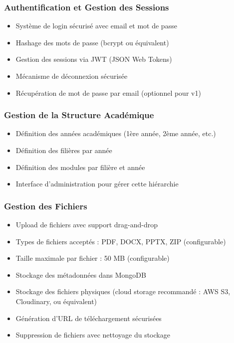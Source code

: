 \documentclass[12pt,a4paper]{article}
\begin{document}
\subsubsection{Authentification et Gestion des Sessions}

\begin{itemize}[leftmargin=*]
    \item Système de login sécurisé avec email et mot de passe
    \item Hashage des mots de passe (bcrypt ou équivalent)
    \item Gestion des sessions via JWT (JSON Web Tokens)
    \item Mécanisme de déconnexion sécurisée
    \item Récupération de mot de passe par email (optionnel pour v1)
\end{itemize}

\subsubsection{Gestion de la Structure Académique}

\begin{itemize}[leftmargin=*]
    \item Définition des années académiques (1ère année, 2ème année, etc.)
    \item Définition des filières par année
    \item Définition des modules par filière et année
    \item Interface d'administration pour gérer cette hiérarchie
\end{itemize}

\subsubsection{Gestion des Fichiers}

\begin{itemize}[leftmargin=*]
    \item Upload de fichiers avec support drag-and-drop
    \item Types de fichiers acceptés : PDF, DOCX, PPTX, ZIP (configurable)
    \item Taille maximale par fichier : 50 MB (configurable)
    \item Stockage des métadonnées dans MongoDB
    \item Stockage des fichiers physiques (cloud storage recommandé : AWS S3, Cloudinary, ou équivalent)
    \item Génération d'URL de téléchargement sécurisées
    \item Suppression de fichiers avec nettoyage du stockage
\end{itemize}
\end{document}
